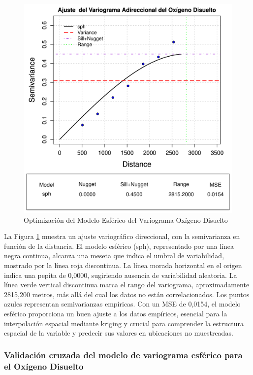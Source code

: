 \begin{enumerate}
\begin{figure}[!htb]
    \centering
    \includegraphics[width=0.8\linewidth]{Figuras_AED//VARIO_OD/od_VarioEyeEstimation.pdf}
    \caption{ Optimización  del Modelo Esférico del Variograma Oxígeno Disuelto}
    \label{fig:enter-labelqwwe}
\end{figure}

La Figura \ref{fig:enter-labelqwwe} muestra un ajuste variográfico direccional, con la semivarianza en función de la distancia. El modelo esférico (sph), representado por una línea negra continua, alcanza una meseta que indica el umbral de variabilidad, mostrado por la línea roja discontinua. La línea morada horizontal en el origen indica una pepita de 0,0000, sugiriendo ausencia de variabilidad aleatoria. La línea verde vertical discontinua marca el rango del variograma, aproximadamente 2815,200 metros, más allá del cual los datos no están correlacionados. Los puntos azules representan semivarianzas empíricas. Con un MSE de 0,0154, el modelo esférico proporciona un buen ajuste a los datos empíricos, esencial para la interpolación espacial mediante kriging y crucial para comprender la estructura espacial de la variable y predecir sus valores en ubicaciones no muestreadas.




\end{enumerate}
 \subsubsection{Validación cruzada del modelo de variograma esférico para el Oxígeno Disuelto}


